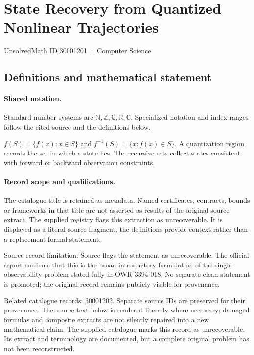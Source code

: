 \documentclass[11pt]{article}
\begin{document}
\setcounter{section}{30001200}
\section{State Recovery from Quantized Nonlinear Trajectories}\label{30001201}
{\small\sffamily UnsolvedMath ID 30001201 · Computer Science}
\subsection{Definitions and mathematical statement}

\paragraph{Shared notation.}Standard number systems are $\mathbb N,\mathbb Z,\mathbb Q,\mathbb R,\mathbb C$. Specialized notation and index ranges follow the cited source and the definitions below.


$f(S)=\{f(x):x\in S\}$ and $f^{-1}(S)=\{x:f(x)\in S\}$. A quantization region records the set in which a state lies. The recursive sets collect states consistent with forward or backward observation constraints.
\paragraph{Record scope and qualifications.}
The catalogue title is retained as metadata. Named certificates, contracts, bounds or frameworks in that title are not asserted as results of the original source extract.
The supplied registry flags this extraction as unrecoverable. It is displayed as a literal source fragment; the definitions provide context rather than a replacement formal statement.

Source-record limitation: Source flags the statement as unrecoverable: The official report confirms that this is the broad introductory formulation of the single observability problem stated fully in OWR-3394-018. No separate clean statement is promoted; the original record remains publicly visible for provenance.

Related catalogue records: \href{https://mehmetmars7.github.io/Erdosproblems-llm-hunter/problem.html?type=open_problems&id=30001202}{30001202}. Separate source IDs are preserved for their provenance.
The source text below is rendered literally where necessary; damaged formulas and composite extracts are not silently repaired into a new mathematical claim.
The supplied catalogue marks this record as unrecoverable. Its extract and terminology are documented, but a complete original problem has not been reconstructed.
\end{document}
